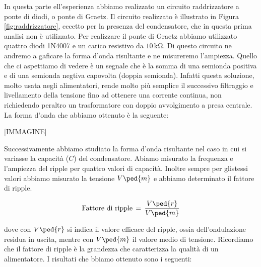 In questa parte ell'esperienza abbiamo realizzato un circuito raddrizzatore a ponte di diodi, o ponte di Graetz. Il circuito realizzato è illustrato in Figura \ref{fig:raddrizzatore}, eccetto per la presenza del condensatore, che in questa prima analisi non è utilizzato.
Per realizzare il ponte di Graetz abbiamo utilizzato quattro diodi 1N4007 e un carico resistivo da $10\,\si{\kilo\ohm}$. Di questo circuito ne andremo a gaficare la forma d'onda risultante e ne misureremo l'ampiezza.
Quello che ci aspettiamo di vedere è un segnale che è la somma di una semionda positiva e di una semionda negtiva capovolta (doppia semionda).
Infatti questa soluzione, molto usata negli alimentatori, rende molto più semplice il successivo filtraggio e livellamento della tensione fino ad ottenere una corrente continua, non richiedendo peraltro un trasformatore con doppio avvolgimento a presa centrale.
La forma d'onda che abbiamo ottenuto è la seguente:

[IMMAGINE]

Successivamente abbiamo studiato la forma d'onda risultante nel caso in cui si variasse la capacità ($C$) del condensatore. Abiamo misurato la frequenza e l'ampiezza del ripple per quattro valori di capacità. Inoltre sempre per glistessi valori abbiamo misurato la tensione $V\ped{m}$ e abbiamo determinato il fattore di ripple.

\begin{equation}
	\text{Fattore di ripple} \,=\, \frac{V\ped{r}}{V\ped{m}}
\end{equation}

dove con $V\ped{r}$ si indica il valore efficace del ripple, ossia dell’ondulazione residua in uscita, mentre con $V\ped{m}$ il valore medio di tensione.
Ricordiamo che il fattore di ripple è la grandezza che caratterizza la qualità di un alimentatore.
I risultati che bbiamo ottenuto sono i seguenti:







